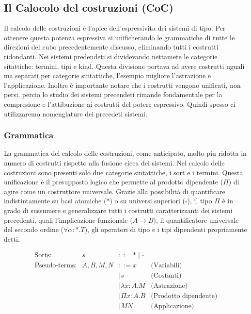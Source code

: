 \subsection{Il Calocolo del costruzioni (CoC)}
Il calcolo delle costruzioni è l'apice dell'espressivita dei sistemi di tipo. Per ottenere questa potenza espressiva si unificherando le grammatiche di tutte le
direzioni del cubo precedentemente discusso, eliminando tutti i costrutti ridondanti. Nei sistemi predendeti si dividevando nettamete le categorie 
sitattiche: termini, tipi e kind. Questa divisione portava ad avere costrutti uguali ma separati per categorie sintattiche, l'esempio migliore l'astrazione e l'applicazione.
Inoltre è importante notare che i costrutti vengono unificati, non persi, percio lo studio dei sistemi precendeti rimande fondamentale per la compresione e l'attibuzione ai
costrutti del potere espressivo. Quindi spesso ci utilizzaremo nomenglature dei precedeti sistemi.

\subsubsection{Grammatica}
La grammatica del calcolo delle costruzioni, come anticipato, molto piu ridotta in numero di costrutti rispetto alla fusione cieca dei sistemi. Nel calcolo delle costruzioni
sono presenti solo due categorie sintattiche, i sort e i termini. Questa unificazione è il presupposto logico che permette al prodotto dipendente ($\Pi$) di agire come un 
costruttore universale. Grazie alla possibilità di quantificare indistintamente su basi atomiche ($\ast$) o su universi superiori ($\square$), il tipo $\Pi$ è in grado di sussumere 
e generalizzare tutti i costrutti caratterizzanti dei sistemi precedenti, quali l'implicazione funzionale ($A \to B$), il quantificatore universale del secondo ordine 
($\forall \alpha : \ast . T$), gli operatori di tipo e i tipi dipendenti propriamente detti.

\begin{equation}
    \begin{array}{lrll}
        \text{Sorts:}           & s           & ::= \ast \mid \square   &                               \\
        \text{Pseudo-terms:}    & A, B, M, N  & ::= x                   & \text{(Variabili)}            \\
                                &             & \mid s                  & \text{(Costanti)}             \\
                                &             & \mid \lambda x : A.M    & \text{(Astrazione)}           \\
                                &             & \mid \Pi x : A.B        & \text{(Prodotto dipendente)}  \\
                                &             & \mid M N                & \text{(Applicazione)}
    \end{array}
    \tag{CoC}
    \label{eq:coc_grammar}
\end{equation}


